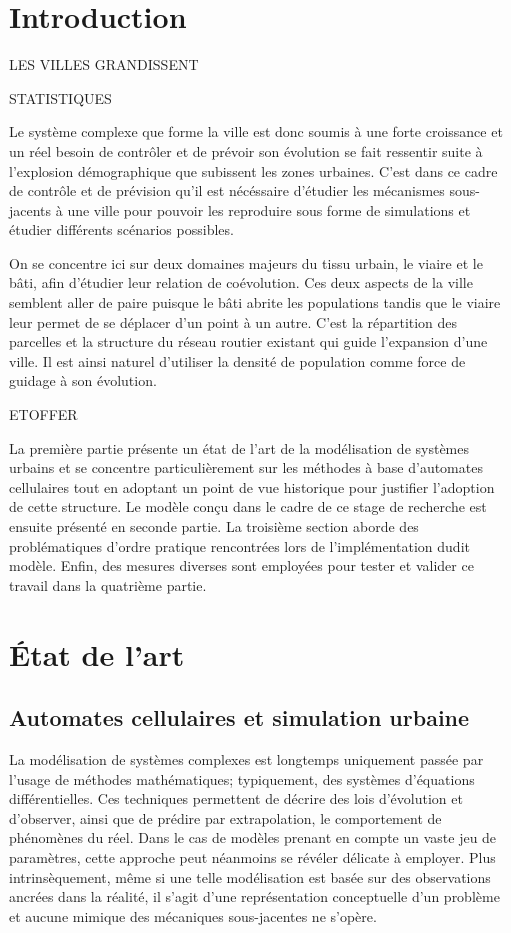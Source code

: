 \documentclass[12pt]{article}
\begin{document}
\newpage

\section{Introduction}

LES VILLES GRANDISSENT

STATISTIQUES

Le système complexe que forme la ville est donc soumis à une forte
croissance et un réel besoin de contrôler et de prévoir son évolution
se fait ressentir suite à l'explosion démographique que subissent les
zones urbaines. C'est dans ce cadre de contrôle et de prévision qu'il
est nécéssaire d'étudier les mécanismes sous-jacents à une ville pour
pouvoir les reproduire sous forme de simulations et étudier différents
scénarios possibles.

On se concentre ici sur deux domaines majeurs du tissu urbain, le
viaire et le bâti, afin d'étudier leur relation de coévolution. Ces
deux aspects de la ville semblent aller de paire puisque le bâti
abrite les populations tandis que le viaire leur permet de se déplacer
d'un point à un autre. C'est la répartition des parcelles et la
structure du réseau routier existant qui guide l'expansion d'une
ville. Il est ainsi naturel d'utiliser la densité de population comme
force de guidage à son évolution.

ETOFFER

La première partie présente un état de l'art de la modélisation de
systèmes urbains et se concentre particulièrement sur les méthodes à
base d'automates cellulaires tout en adoptant un point de vue
historique pour justifier l'adoption de cette structure. Le modèle
conçu dans le cadre de ce stage de recherche est ensuite présenté en
seconde partie. La troisième section aborde des problématiques d'ordre
pratique rencontrées lors de l'implémentation dudit modèle. Enfin, des
mesures diverses sont employées pour tester et valider ce travail dans
la quatrième partie.

\section{\'Etat de l'art}

\subsection{Automates cellulaires et simulation urbaine}

La modélisation de systèmes complexes est longtemps uniquement passée
par l'usage de méthodes mathématiques; typiquement, des systèmes
d'équations différentielles. Ces techniques permettent de décrire des
lois d'évolution et d'observer, ainsi que de prédire par
extrapolation, le comportement de phénomènes du réel. Dans le cas de
modèles prenant en compte un vaste jeu de paramètres, cette approche
peut néanmoins se révéler délicate à employer. Plus intrinsèquement,
même si une telle modélisation est basée sur des observations ancrées
dans la réalité, il s'agit d'une représentation conceptuelle d'un
problème et aucune mimique des mécaniques sous-jacentes ne s'opère.
\end{document}
